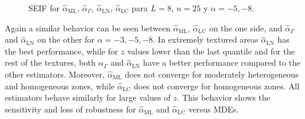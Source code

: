\documentclass[twocolumn]{svjour3}
\begin{document}
	\begin{figure}[hbt]
		\centering
		\caption{SEIF for $\widehat{\alpha}_{\text{{ML}}}$, $\widehat{\alpha}_{\Gamma}$, $\widehat{\alpha}_{\text{{LN}}}$, $\widehat{\alpha}_{\text{{LC}}}$ para $L=8$, $n=25$ y $\alpha=-5,-8$.}\label{SEIFL8b} 
	\end{figure}
	
	Again a similar behavior can be seen between $\widehat{\alpha}_{\text{{ML}}}$, $\widehat{\alpha}_{\text{{LC}}}$ on the one side, and $\widehat{\alpha}_{\Gamma}$ and $\widehat{\alpha}_{\text{{LN}}}$ on the other for $\alpha=-3, -5, -8$. 
	In extremely textured areas $\widehat{\alpha}_{\text{{LN}}}$ has the best performance, while for $z$ values lower than the last quantile and for the rest of the textures, both $\widehat{\alpha}_{\Gamma}$ and $\widehat{\alpha}_{\text{{LN}}}$ have a better performance compared to the other estimators. 
	Moreover, $\widehat{\alpha}_{\text{{ML}}}$ does not converge for moderately heterogeneous and homogeneous zones, while $\widehat{\alpha}_{\text{{LC}}}$ does not converge for homogeneous zones. All estimators behave similarly for large values of $z$. 
	This behavior shows the sensitivity and loss of robustness for $\widehat{\alpha}_{\text{{ML}}}$ and $\widehat{\alpha}_{\text{{LC}}}$ versus MDEs.
	
\end{document}
